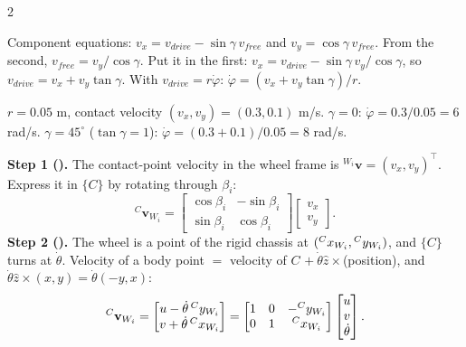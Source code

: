 \begin{multicols}{2}
\begin{deriv}
Component equations: $v_x=v_{drive}-\sin\gamma\,v_{free}$ and $v_y=\cos\gamma\,v_{free}$. From the second, $v_{free}=v_y/\cos\gamma$. Put it in the first: $v_x=v_{drive}-\sin\gamma\,v_y/\cos\gamma$, so $v_{drive}=v_x+v_y\tan\gamma$. With $v_{drive}=r\dot\varphi$: $\dot\varphi=(v_x+v_y\tan\gamma)/r$.
\end{deriv}
\begin{worked}[\added]
$r=0.05$ m, contact velocity $(v_x,v_y)=(0.3,0.1)$ m/s. $\gamma=0$: $\dot\varphi=0.3/0.05=6$ rad/s. $\gamma=45^\circ$ ($\tan\gamma=1$): $\dot\varphi=(0.3+0.1)/0.05=8$ rad/s. \chk
\end{worked}

\begin{deriv}
\textbf{Step 1 ().} The contact-point velocity in the wheel frame is ${}^{W_i}\mathbf v=(v_x,v_y)^\top$. Express it in $\{C\}$ by rotating through $\beta_i$:
\[{}^{C}\mathbf v_{W_i}=\begin{bmatrix}\cos\beta_i&-\sin\beta_i\\\sin\beta_i&\cos\beta_i\end{bmatrix}\begin{bmatrix}v_x\\v_y\end{bmatrix}.\]
\textbf{Step 2 ().} The wheel is a point of the rigid chassis at $({}^{C}x_{W_{i}},{}^{C}y_{W_{i}})$, and $\{C\}$ turns at $\dot\theta$. Velocity of a body point $=$ velocity of $C$ $+\ \dot\theta\hat z\times$(position), and $\dot\theta\hat z\times(x,y)=\dot\theta(-y,x)$:
\[{}^{C}\mathbf v_{W_i}=\begin{bmatrix}u-\dot\theta\,{}^{C}y_{W_{i}}\\v+\dot\theta\,{}^{C}x_{W_{i}}\end{bmatrix}=\begin{bmatrix}1&0&-{}^{C}y_{W_{i}}\\0&1&{}^{C}x_{W_{i}}\end{bmatrix}\begin{bmatrix}u\\v\\\dot\theta\end{bmatrix}.\]

\end{deriv}
\end{multicols}
